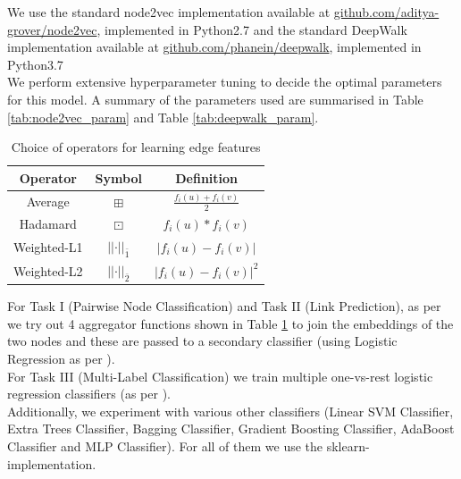 \documentclass[sigconf]{acmart}
\begin{document}
We use the standard node2vec implementation available at \href{https://github.com/aditya-grover/node2vec}{github.com/aditya-grover/node2vec}, implemented in Python2.7 and the standard DeepWalk implementation available at \href{https://github.com/phanein/deepwalk}{github.com/phanein/deepwalk}, implemented in Python3.7 \\

We perform extensive hyperparameter tuning to decide the optimal parameters for this model. A summary of the parameters used are summarised in Table \ref{tab:node2vec_param} and Table \ref{tab:deepwalk_param}. \\

\begin{table}[h]
\begin{center}
\begin{tabular}{ c|c|c } 
 \textbf{Operator} & \textbf{Symbol} & \textbf{Definition} \\ 
 \hline
 Average & $\boxplus$ & $\frac{f_{i}(u) + f_{i}(v)}{2}$ \\
 Hadamard & $\boxdot$ & $f_{i}(u) * f_{i}(v)$ \\ 
 Weighted-L1 & $\vert\vert \cdot \vert\vert_{\bar{1}}$ & $\vert f_{i}(u) - f_{i}(v) \vert$ \\ 
 Weighted-L2 & $\vert\vert \cdot \vert\vert_{\bar{2}}$ & $\vert f_{i}(u) - f_{i}(v) \vert^{2}$ \\ 

\end{tabular}
\end{center}
\caption{Choice of operators for learning edge features}
\label{tab:agg}
\end{table}

For Task I (Pairwise Node Classification) and Task II (Link Prediction), as per \cite{node2vec-kdd2016} we try out 4 aggregator functions shown in Table \ref{tab:agg} to join the embeddings of the two nodes and these are passed to a secondary classifier (using Logistic Regression as per \cite{node2vec-kdd2016}). \\
For Task III (Multi-Label Classification) we train multiple one-vs-rest logistic regression classifiers (as per \cite{node2vec-kdd2016}). \\
Additionally, we experiment with various other classifiers (Linear SVM Classifier, Extra Trees Classifier, Bagging Classifier, Gradient Boosting Classifier, AdaBoost Classifier and MLP Classifier). For all of them we use the sklearn-implementation.  
\newpage
\end{document}
